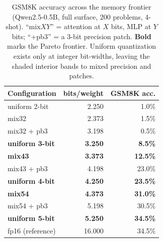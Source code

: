 \documentclass[manuscript, screen, review]{jair}
\newcommand{\bpw}{bits/weight}
\begin{document}
\begin{table}[t]
\centering
\caption{GSM8K accuracy across the memory frontier (Qwen2.5-0.5B, full
surface, 200 problems, 4-shot). ``mix$XY$'' = attention at $X$ bits, MLP at $Y$
bits; ``+pb3'' = a 3-bit precision patch. \textbf{Bold} marks the Pareto
frontier. Uniform quantization exists only at integer bit-widths, leaving the
shaded interior bands to mixed precision and patches.}
\label{tab:frontier}
\begin{tabular}{lrr}
\toprule
Configuration & \bpw{} & GSM8K acc. \\
\midrule
uniform 2-bit & 2.250 & 1.0\% \\
mix32 & 2.373 & 1.5\% \\
mix32 + pb3 & 3.198 & 0.5\% \\
\textbf{uniform 3-bit} & \textbf{3.250} & \textbf{8.5\%} \\
\textbf{mix43} & \textbf{3.373} & \textbf{12.5\%} \\
mix43 + pb3 & 4.198 & 23.0\% \\
\textbf{uniform 4-bit} & \textbf{4.250} & \textbf{23.5\%} \\
\textbf{mix54} & \textbf{4.373} & \textbf{31.0\%} \\
mix54 + pb3 & 5.198 & 30.5\% \\
\textbf{uniform 5-bit} & \textbf{5.250} & \textbf{34.5\%} \\
\midrule
fp16 (reference) & 16.000 & 34.5\% \\
\bottomrule
\end{tabular}
\end{table}
\end{document}
